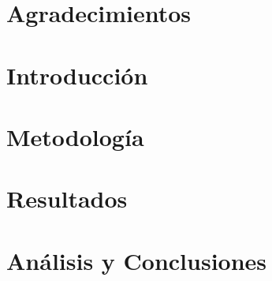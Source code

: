 \documentclass[12pt, a4paper]{report}
\begin{document}


\chapter*{Agradecimientos}

\newpage

\tableofcontents
\newpage

\chapter{Introducción}

\newpage

\chapter{Metodología}

\newpage

\chapter{Resultados}

\newpage

\chapter{Análisis y Conclusiones}

\newpage

 

\end{document}
